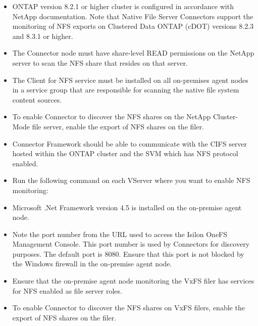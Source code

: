 \documentclass[letterpaper,10pt,english]{sphinxmanual}
\begin{document}
\begin{itemize}
\item {} 
ONTAP version 8.2.1 or higher cluster is configured in accordance with NetApp documentation. Note that Native File Server Connectors support the monitoring of NFS exports on Clustered Data ONTAP (cDOT) versions 8.2.3 and 8.3.1 or higher.

\item {} 
The Connector node must have share-level READ permissions on the NetApp server to scan the NFS share that resides on that server.

\item {} 
The Client for NFS service must be installed on all on-premises agent nodes in a service group that are responsible for scanning the native file system content sources.

\item {} 
To enable Connector to discover the NFS shares on the NetApp Cluster-Mode file server, enable the export of NFS shares on the filer.

\item {} 
Connector Framework should be able to communicate with the CIFS server hosted within the ONTAP cluster and the SVM which has NFS protocol enabled.

\item {} 
Run the following command on each VServer where you want to enable NFS monitoring:

\end{itemize}
\begin{quote}

\end{quote}

\begin{itemize}
\item {} 
Microsoft .Net Framework version 4.5 is installed on the on-premise agent node.

\item {} 
Note the port number from the URL used to access the Isilon OneFS Management Console. This port number is used by Connectors for discovery purposes. The default port is 8080. Ensure that this port is not blocked by the Windows firewall in the on-premise agent node.

\end{itemize}

\begin{itemize}
\item {} 
Ensure that the on-premise agent node monitoring the VxFS filer has services for NFS enabled as file server roles.

\item {} 
To enable Connector to discover the NFS shares on VxFS filers, enable the export of NFS shares on the filer.

\end{itemize}
\end{document}
